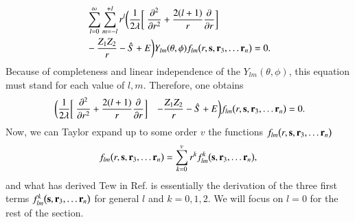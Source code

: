 \documentclass[aip,jcp,reprint,noshowkeys,superscriptaddress]{revtex4-1}
\newcommand{\deriv}[3]{\frac{\partial^{#3} #1}{\partial {#2}^{#3}}}
\newcommand{\bd}[1]{{\bf {#1}}}
\newcommand{\bs}[0]{{\bf {s}}}
\begin{document}
\begin{equation}
 \begin{aligned}
& \sum_{l=0}^\infty \sum_{m=-l}^{+l} r^l\bigg( \frac{1}{2\lambda} \bigg[ \deriv{}{r}{2} + \frac{2(l+1)}{r} \deriv{}{r}{}\bigg] \\ 
&- \frac{Z_1 Z_2}{r}  - \hat{S} + E \bigg) Y_{lm}(\theta,\phi) f_{lm}\big(r,\bs,\bd{r}_3, \hdots \bd{r}_n\big) =0.
 \end{aligned}
\end{equation}
Because of completeness and linear independence of the $Y_{lm}(\theta,\phi)$, this equation must stand for each value of $l,m$. Therefore, one obtains 
\begin{equation}
 \label{eq:schro_l}
 \begin{aligned}
& \bigg( \frac{1}{2\lambda} \bigg[ \deriv{}{r}{2} + \frac{2(l+1)}{r} \deriv{}{r}{}\bigg] 
&- \frac{Z_1 Z_2}{r}  - \hat{S} + E \bigg) f_{lm}\big(r,\bs,\bd{r}_3, \hdots \bd{r}_n\big) =0.
 \end{aligned}
\end{equation}
Now, we can Taylor expand up to some order $v$ the functions $f_{lm}\big(r,\bs,\bd{r}_3, \hdots \bd{r}_n\big) $ 
\begin{equation}
 \label{eq:tayl_flm}
 f_{lm}\big(r,\bs,\bd{r}_3, \hdots \bd{r}_n\big)  = \sum_{k=0}^v r^k f_{lm}^k\big(\bs,\bd{r}_3, \hdots \bd{r}_n\big), 
\end{equation}
and what has derived Tew in Ref.  is essentially the derivation of the three first terms $f_{lm}^k\big(\bs,\bd{r}_3, \hdots \bd{r}_n\big)$ for general $l$ and $k=0,1,2$. We will focus on $l=0$ for the rest of the section. 
\end{document}
